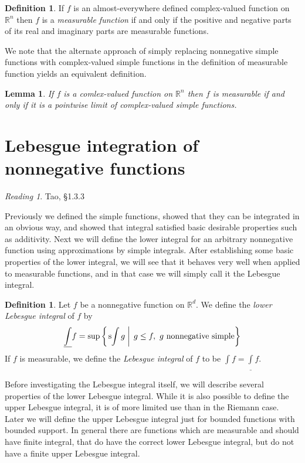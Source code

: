 \documentclass[11pt,oneside]{amsbook}
\newcommand{\RR}{{\mathbb R}}
\newcommand{\lint}{\underline\int}
\theoremstyle{definition}
\theoremstyle{plain}
\newtheorem{lem}[thm]{Lemma}
\theoremstyle{definition}
\newtheorem{defn}[thm]{Definition}
\theoremstyle{remark}
\newtheorem*{reading}{Reading}
\numberwithin{equation}{section}
\numberwithin{figure}{section}
\begin{document}
\begin{defn}
  If $f$ is an almost-everywhere defined complex-valued function on $\RR^n$ then $f$ is a \emph{measurable function} if and only if the positive and negative parts of its real and imaginary parts are measurable functions.
\end{defn}

We note that the alternate approach of simply replacing nonnegative simple functions with complex-valued simple functions in the definition of measurable function yields an equivalent definition.

\begin{lem}
  If $f$ is a comlex-valued function on $\RR^n$ then $f$ is measurable if and only if it is a pointwise limit of complex-valued simple functions.
\end{lem}

\section{Lebesgue integration of nonnegative functions}

\begin{reading}
  Tao, \S 1.3.3
\end{reading}

Previously we defined the simple functions, showed that they can be integrated in an obvious way, and showed that integral satisfied basic desirable properties such as additivity. Next we will define the lower integral for an arbitrary nonnegative function using approximations by simple integrals. After establishing some basic properties of the lower integral, we will see that it behaves very well when applied to measurable functions, and in that case we will simply call it the Lebesgue integral.

\begin{defn}
  Let $f$ be a nonnegative function on $\RR^d$. We define the \emph{lower Lebesgue integral} of $f$ by
  \[\underline{\int}f=\sup\left\{\left.\text{s}\kern-2pt\int g\;\right|\; g\leq f,\text{ $g$ nonnegative simple}\right\}
  \]
  If $f$ is measurable, we define the \emph{Lebesgue integral} of $f$ to be $\int f=\lint f$.
\end{defn}

Before investigating the Lebesgue integral itself, we will describe several properties of the lower Lebesgue integral. While it is also possible to define the upper Lebesgue integral, it is of more limited use than in the Riemann case. Later we will define the upper Lebesgue integral just for bounded functions with bounded support. In general there are functions which are measurable and should have finite integral, that do have the correct lower Lebesgue integral, but do not have a finite upper Lebesgue integral.
\end{document}
